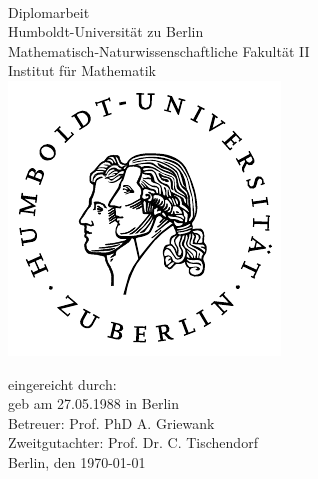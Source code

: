 \begin{spacing}{1}
\begin{titlepage}
\begin{otherlanguage}{ngerman}
\enlargethispage{4\baselineskip}
\vspace{3cm}
\begin{center}
	\Huge{\bfseries\thetitle}\\[1cm]
	\LARGE{Diplomarbeit}\\[1cm]
	\normalsize{
	Humboldt-Universität zu Berlin\\
	Mathematisch-Naturwissenschaftliche Fakultät II\\
	Institut für Mathematik\\[1cm]
	}
	\includegraphics[height=0.3\textheight]{img/plain/husiegel.pdf}\\[0.5cm]
\end{center}
\vfill

\begin{flushleft}
\large{
eingereicht durch: \theauthor\\
geb am 27.05.1988 \quad in Berlin\\
Betreuer: Prof. PhD A. Griewank\\
Zweitgutachter: Prof. Dr. C. Tischendorf\\
Berlin, den \today
}
\end{flushleft}
\end{otherlanguage}
\end{titlepage}
\tableofcontents

\renewcommand*\listfigurename{Darstellungsverzeichnis}
\listoffigures
\end{spacing}